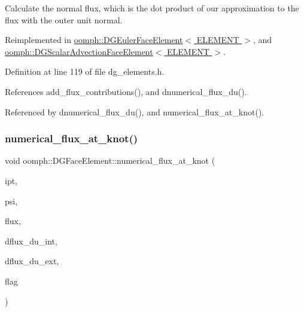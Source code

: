 Calculate the normal flux, which is the dot product of our approximation to the flux with the outer unit normal. 



Reimplemented in \hyperlink{classoomph_1_1DGEulerFaceElement_a44655910de79b442bfffaefe0152f776}{oomph\+::\+D\+G\+Euler\+Face\+Element$<$ E\+L\+E\+M\+E\+N\+T $>$}, and \hyperlink{classoomph_1_1DGScalarAdvectionFaceElement_afdbb802744c914451223b5664bb589e4}{oomph\+::\+D\+G\+Scalar\+Advection\+Face\+Element$<$ E\+L\+E\+M\+E\+N\+T $>$}.



Definition at line 119 of file dg\+\_\+elements.\+h.



References add\+\_\+flux\+\_\+contributions(), and dnumerical\+\_\+flux\+\_\+du().



Referenced by dnumerical\+\_\+flux\+\_\+du(), and numerical\+\_\+flux\+\_\+at\+\_\+knot().

\mbox{\label{classoomph_1_1DGFaceElement_ab75e12cd6a07fac5daabb122ffa29429}} 
\subsubsection{\texorpdfstring{numerical\+\_\+flux\+\_\+at\+\_\+knot()}{numerical\_flux\_at\_knot()}}
{\footnotesize\ttfamily void oomph\+::\+D\+G\+Face\+Element\+::numerical\+\_\+flux\+\_\+at\+\_\+knot (\begin{DoxyParamCaption}\item[{const unsigned \&}]{ipt,  }\item[{const \hyperlink{classoomph_1_1Shape}{Shape} \&}]{psi,  }\item[{\hyperlink{classoomph_1_1Vector}{Vector}$<$ double $>$ \&}]{flux,  }\item[{\hyperlink{classoomph_1_1DenseMatrix}{Dense\+Matrix}$<$ double $>$ \&}]{dflux\+\_\+du\+\_\+int,  }\item[{\hyperlink{classoomph_1_1DenseMatrix}{Dense\+Matrix}$<$ double $>$ \&}]{dflux\+\_\+du\+\_\+ext,  }\item[{unsigned}]{flag }\end{DoxyParamCaption})\hspace{0.3cm}{\ttfamily [virtual]}}



